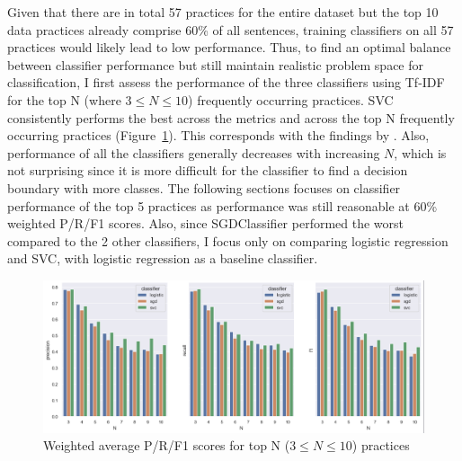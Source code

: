 Given that there are in total 57 practices for the entire dataset but the top 10 data practices already comprise 60\% of all sentences, training classifiers on all 57 practices would likely lead to low performance. Thus, to find an optimal balance between classifier performance but still maintain realistic problem space for classification, I first assess the performance of the three classifiers using Tf-IDF for the top N (where $3 \le N \le 10$) frequently occurring practices. SVC consistently performs the best across the metrics and across the top N frequently occurring practices (Figure~\ref{fig:top_n_practices}). This corresponds with the findings by \cite{zimmeck2019}. Also, performance of all the classifiers generally decreases with increasing $N$, which is not surprising since it is more difficult for the classifier to find a decision boundary with more classes. The following sections focuses on classifier performance of the top 5 practices as performance was still reasonable at 60\% weighted P/R/F1 scores. Also, since SGDClassifier performed the worst compared to the 2 other classifiers, I focus only on comparing logistic regression and SVC, with logistic regression as a baseline classifier.

\begin{figure}[!ht]
	\centering
	\includegraphics[width=1\textwidth]{figures/model_n_testing_sentence.png}      
    \caption{Weighted average P/R/F1 scores for top N ($3 \le N \le 10$) practices}
    \label{fig:top_n_practices}
\end{figure}

